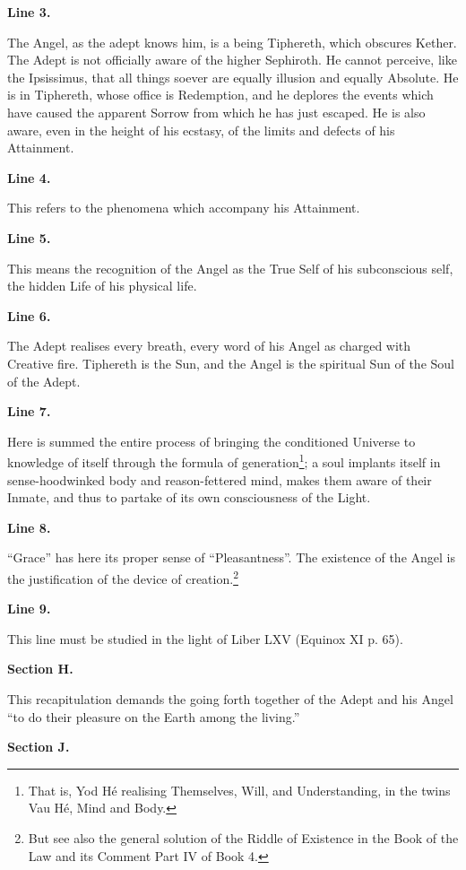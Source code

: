 \textbf{Line 3.}

The Angel, as the adept knows him, is a being Tiphereth, which obscures Kether. The Adept is not officially aware of the higher Sephiroth. He cannot perceive, like the Ipsissimus, that all things soever are equally illusion and equally Absolute. He is in Tiphereth, whose office is Redemption, and he deplores the events which have caused the apparent Sorrow from which he has just escaped. He is also aware, even in the height of his ecstasy, of the limits and defects of his Attainment.

\textbf{Line 4.}


This refers to the phenomena which accompany his Attainment.


\textbf{Line 5.}

This means the recognition of the Angel as the True Self of his subconscious self, the hidden Life of his physical life.

\textbf{Line 6.}


The Adept realises every breath, every word of his Angel as charged with Creative fire. Tiphereth is the Sun, and the Angel is the spiritual Sun of the Soul of the Adept.


\textbf{Line 7.}

Here is summed the entire process of bringing the conditioned Universe to knowledge of itself through the formula of generation\footnote{That is, Yod H\'{e} realising Themselves, Will, and Understanding, in the twins Vau H\'{e}, Mind and Body.}; a soul implants itself in sense-hoodwinked body and reason-fettered mind, makes them aware of their Inmate, and thus to partake of its own consciousness of the Light.

\textbf{Line 8.}


\enquote{Grace} has here its proper sense of \enquote{Pleasantness}. The existence of the Angel is the justification of the device of creation.\footnote{But see also the general solution of the Riddle of Existence in the Book of the Law and its Comment \textemdash{} Part IV of Book 4.}


\textbf{Line 9.}

This line must be studied in the light of Liber LXV (Equinox XI p. 65).

\pagebreak[1]
\textbf{Section H.}


This recapitulation demands the going forth together of the Adept and his Angel \enquote{to do their pleasure on the Earth among the living.}


\pagebreak[1]
\textbf{Section J.}



